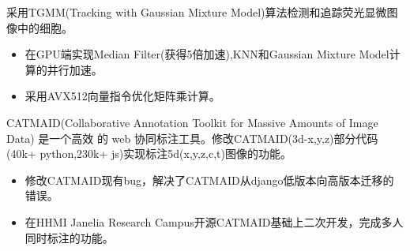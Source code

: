 \documentclass{resume}
\begin{document}
\begin{onehalfspacing}
   采用TGMM(Tracking with Gaussian Mixture Model)算法检测和追踪荧光显微图像中的细胞。
\begin{itemize}
    \item 在GPU端实现Median Filter(获得5倍加速),KNN和Gaussian Mixture Model计算的并行加速。
  \item 采用AVX512向量指令优化矩阵乘计算。
\end{itemize}
\end{onehalfspacing}


\begin{onehalfspacing}
CATMAID(Collaborative Annotation Toolkit for Massive Amounts of Image Data) 是一个高效
    的 web 协同标注工具。修改CATMAID(3d-x,y,z)部分代码(40k+ python,230k+ js)实现标注5d(x,y,z,c,t)图像的功能。
\begin{itemize}
  \item 修改CATMAID现有bug，解决了CATMAID从django低版本向高版本迁移的错误。
  \item 在HHMI Janelia Research Campus开源CATMAID基础上二次开发，完成多人同时标注的功能。
\end{itemize}
\end{onehalfspacing}


\end{document}
